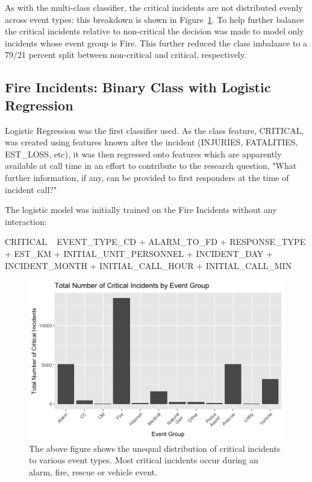 \documentclass[12pt,letterpaper, oneside]
{article}
\begin{document}
As with the multi-class classifier, the critical incidents are not distributed evenly across event types: this breakdown is shown in Figure~\ref{fig:critical-events}. To help further balance the critical incidents relative to non-critical the decision was made to model only incidents whose event group is Fire. This further reduced the class imbalance to a 79/21 percent split between non-critical and critical, respectively.

\subsection{Fire Incidents: Binary Class with Logistic Regression}

Logistic Regression was the first classifier used. As the class feature, \textsf{CRITICAL}, was created using features known after the incident (\textsf{INJURIES, FATALITIES, EST\_LOSS}, etc), it was then regressed onto features which are apparently available at call time in an effort to contribute to the research question, "What further information, if any, can be provided to first responders at the time of incident call?"

The logistic model was initially trained on the Fire Incidents without any interaction: 

\noindent\textsf{CRITICAL ~ EVENT\_TYPE\_CD + ALARM\_TO\_FD + RESPONSE\_TYPE + EST\_KM + INITIAL\_UNIT\_PERSONNEL + INCIDENT\_DAY + INCIDENT\_MONTH + INITIAL\_CALL\_HOUR + INITIAL\_CALL\_MIN}

\begin{figure}
	\centering
		\includegraphics[width=\textwidth]{total_critical_incidents_by_event_group}
		\caption{The above figure shows the unequal distribution of critical incidents to various event types. Most critical incidents occur during an alarm, fire, rescue or vehicle event.
			\label{fig:critical-events}
		}
\end{figure}
\end{document}
